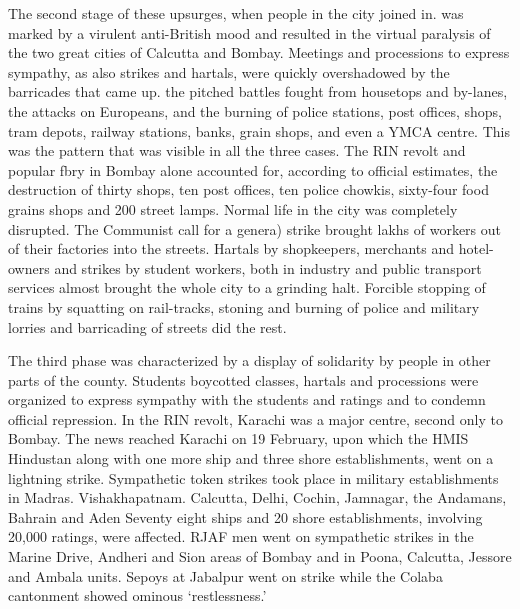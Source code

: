 The second stage of these upsurges, when people in the city joined in. was marked by a virulent anti-British mood and resulted in the virtual paralysis of the two great cities of Calcutta and Bombay. Meetings and processions to express sympathy, as also strikes and hartals, were quickly overshadowed by the barricades that came up. the pitched battles fought from housetops and by-lanes, the attacks on Europeans, and the burning of police stations, post offices, shops, tram depots, railway stations, banks, grain shops, and even a YMCA centre. This was the pattern that was visible in all the three cases. The RIN revolt and popular fbry in Bombay alone accounted for, according to official estimates, the destruction of thirty shops, ten post offices, ten police chowkis, sixty-four food grains shops and 200 street lamps. Normal life in the city was completely disrupted. The Communist call for a genera) strike brought lakhs of workers out of their factories into the streets. Hartals by shopkeepers, merchants and hotel-owners and strikes by student workers, both in industry and public transport services almost brought the whole city to a grinding halt. Forcible stopping of trains by squatting on rail-tracks, stoning and burning of police and military lorries and barricading of streets did the rest. 

The third phase was characterized by a display of solidarity by people in other parts of the county. Students boycotted classes, hartals and processions were organized to express sympathy with the students and ratings and to condemn official repression. In the RIN revolt, Karachi was a major centre, second only to Bombay. The news reached Karachi on 19 February, upon which the HMIS Hindustan along with one more ship and three shore establishments, went on a lightning strike. Sympathetic token strikes took place in military establishments in Madras. Vishakhapatnam. Calcutta, Delhi, Cochin, Jamnagar, the Andamans, Bahrain and Aden Seventy eight ships and 20 shore establishments, involving 20,000 ratings, were affected. RJAF men went on sympathetic strikes in the Marine Drive, Andheri and Sion areas of Bombay and in Poona, Calcutta, Jessore and Ambala units. Sepoys at Jabalpur went on strike while the Colaba cantonment showed ominous `restlessness.' 


